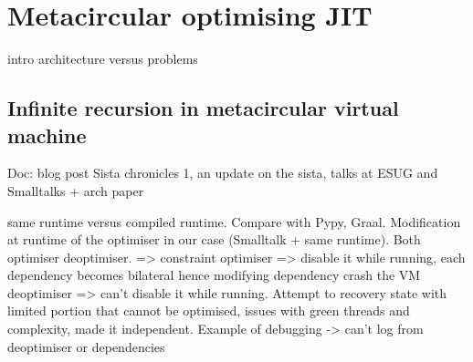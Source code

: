 \documentclass[a4paper,12pt,twoside]{../includes/ThesisStyle}
\begin{document}
\fi

\chapter{Metacircular optimising JIT}
\label{chap:metacircular}
\minitoc

intro architecture versus problems

\section{Infinite recursion in metacircular virtual machine}

Doc: blog post Sista chronicles 1, an update on the sista, talks at ESUG and Smalltalks + arch paper

same runtime versus compiled runtime. Compare with Pypy, Graal. Modification at runtime of the optimiser in our case (Smalltalk + same runtime).
Both optimiser deoptimiser. => constraint
optimiser => disable it while running, each dependency becomes bilateral hence modifying dependency crash the VM
deoptimiser => can't disable it while running. Attempt to recovery state with limited portion that cannot be optimised, issues with green threads and complexity, made it independent.
Example of debugging -> can't log from deoptimiser or dependencies



\ifx\wholebook\relax\else
    
\end{document}
